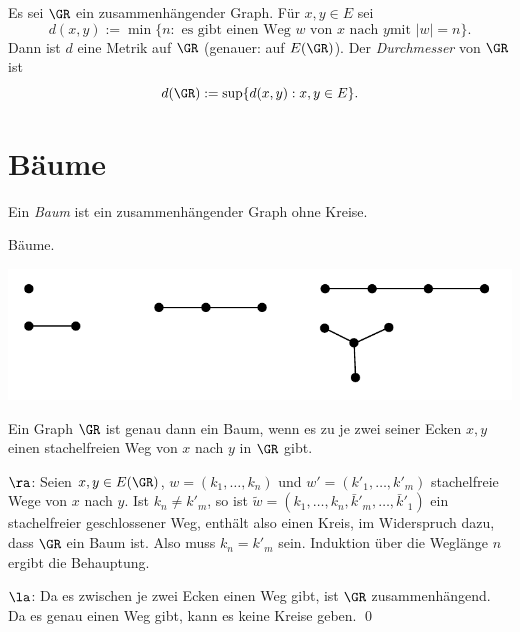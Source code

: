 \DB Es sei $\GR$ ein zusammenhängender Graph. Für $x,y\in E$ sei
\[
d(x,y) := \min\{ n : \text{ es gibt einen Weg $w$ von $x$ nach $y$
	mit $|w|=n$} \}.
\]
Dann ist $d$ eine Metrik auf $\GR$ (genauer: auf $E(\GR)$).
Der \emph{Durchmesser} von $\GR$ ist
\[
d(\GR) := \sup\{ d(x,y) : x,y\in E\}.
\]

\section{Bäume}\label{sec_baum}

\DEF Ein \emph{Baum} ist ein
zusammenhängender Graph ohne Kreise.

\BSP Bäume.
\begin{center}
	\includegraphics{grugraImages/bspbaum}
\end{center}

\PROP Ein Graph $\GR$ ist genau dann ein Baum, wenn es zu je zwei
seiner Ecken $x,y$ einen stachelfreien Weg von $x$ nach $y$ in
$\GR$ gibt.

\bew \glqq$\ra$\grqq: Seien $x,y\in E(\GR)$,
$w=(k_1,\ldots,k_n)$ und $w'=(k'_1,\ldots,k'_m)$ stachelfreie Wege
von $x$ nach $y$. Ist $k_n\neq k'_m$, so ist
$\tilde{w}=(k_1,\ldots,k_n,\bar{k}'_m,\ldots,\bar{k}'_1)$
ein stachelfreier geschlossener Weg, enthält also einen
Kreis, im Widerspruch dazu, dass $\GR$ ein Baum ist.
Also muss $k_n=k'_m$ sein. Induktion über die Weglänge $n$ ergibt
die Behauptung.

\glqq $\la$\grqq: Da es zwischen je zwei Ecken einen Weg gibt, ist
$\GR$ zusammenhängend. Da es genau einen Weg gibt, kann es keine
Kreise geben.
\qed

